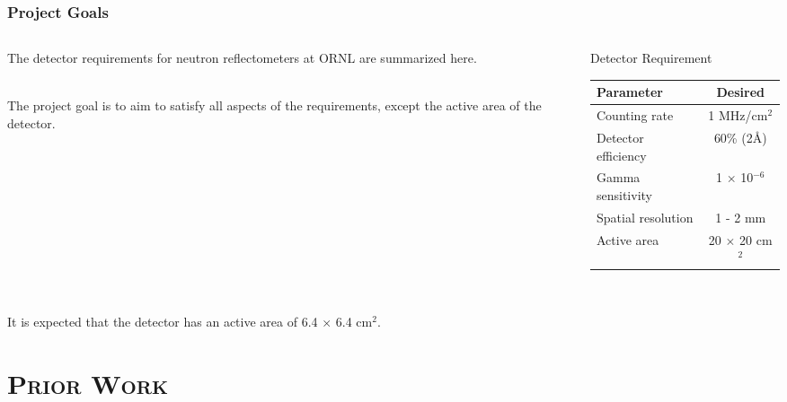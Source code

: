 \documentclass[xcolor=x11names, compress, handout]{beamer}
\renewcommand{\(}{\begin{columns}}
\renewcommand{\)}{\end{columns}}
\newcommand{\<}[1]{\begin{column}{#1}}
\renewcommand{\>}{\end{column}}
\begin{document}
\begin{frame}
  \frametitle{Project Goals}
  \begin{columns}
  \begin{column}{0.45\textwidth}
  The detector requirements for neutron reflectometers at ORNL are summarized here. \\
  \

  The project goal is to aim to satisfy all aspects of the requirements, except the active area of the detector.\\ 
  \

  \end{column}

  \begin{column}{0.5\textwidth}  %
  \begin{block}{Detector Requirement}
  \begin{center}
  \begin{tabular}{l c}
  \hline
  Parameter & Desired \\
  \hline
  Counting rate & 1 MHz/cm$^2$\\
  Detector efficiency & 60\% (2\AA) \\
  Gamma sensitivity & 1 $\times$ 10$^{-6}$\\
  Spatial resolution & 1 - 2 mm \\
  Active area & 20 $\times$ 20 cm$^2$\\
  \hline
  \end{tabular}
  \end{center}
  \end{block}

  \end{column}
  \end{columns}

  \
  \
  \\

  It is expected that the detector has an active area of 6.4 $\times$ 6.4 cm$^2$.

\end{frame}

\section{\scshape Prior Work}
\end{document}
